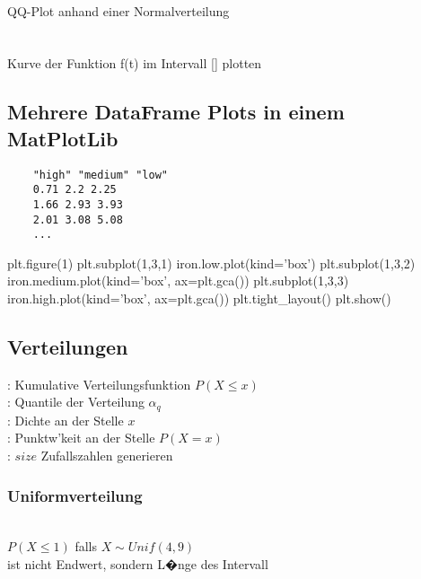 \documentclass{article}
\begin{document}
\begin{multicols*}{3}
 \\
QQ-Plot anhand einer Normalverteilung\\

\\
\\
Kurve der Funktion f(t) im Intervall [] plotten

\subsection*{Mehrere DataFrame Plots in einem MatPlotLib}

\begin{tcolorbox}[boxrule=1pt,colback=black!4!white, title=\underline{\textbf{Struktur der Daten f�r die n�chsten Befehle}},colframe=black!4!white,coltitle=black]
	\begin{verbatim}
	"high" "medium" "low"
	0.71 2.2 2.25
	1.66 2.93 3.93
	2.01 3.08 5.08
	...
	\end{verbatim}
\end{tcolorbox}

\begin{python}
plt.figure(1)
plt.subplot(1,3,1)
iron.low.plot(kind='box')
plt.subplot(1,3,2)
iron.medium.plot(kind='box', ax=plt.gca())
plt.subplot(1,3,3)
iron.high.plot(kind='box', ax=plt.gca())
plt.tight_layout()
plt.show()
\end{python}

\subsection*{Verteilungen}
: Kumulative Verteilungsfunktion $P(X \leq x)$ \\
: Quantile der Verteilung $\alpha_q$ \\
: Dichte an der Stelle $x$ \\
: Punktw'keit an der Stelle $P(X=x)$ \\
: $size$ Zufallszahlen generieren

\subsubsection*{Uniformverteilung}

 \\
$P(X \leq 1)$ falls $X \sim Unif(4, 9)$ \\
\colorbox{red!20!white}{ ist nicht Endwert, sondern L�nge des Intervall}\\


\end{multicols*}
\end{document}
